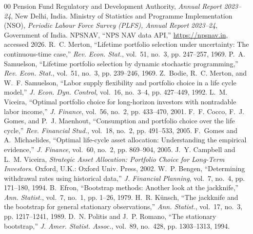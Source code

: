\documentclass[conference]{IEEEtran}
\begin{document}
\begin{thebibliography}{00}
 Pension Fund Regulatory and Development Authority, \emph{Annual Report 2023--24}, New Delhi, India.
 Ministry of Statistics and Programme Implementation (NSO), \emph{Periodic Labour Force Survey (PLFS), Annual Report 2023--24}, Government of India.
 NPSNAV, ``NPS NAV data API,'' \url{https://npsnav.in}, accessed 2026.
 R.~C. Merton, ``Lifetime portfolio selection under uncertainty: The continuous-time case,'' \emph{Rev. Econ. Stat.}, vol.~51, no.~3, pp. 247--257, 1969.
 P.~A. Samuelson, ``Lifetime portfolio selection by dynamic stochastic programming,'' \emph{Rev. Econ. Stat.}, vol.~51, no.~3, pp. 239--246, 1969.
 Z.~Bodie, R.~C. Merton, and W.~F. Samuelson, ``Labor supply flexibility and portfolio choice in a life cycle model,'' \emph{J. Econ. Dyn. Control}, vol.~16, no.~3--4, pp. 427--449, 1992.
 L.~M. Viceira, ``Optimal portfolio choice for long-horizon investors with nontradable labor income,'' \emph{J. Finance}, vol.~56, no.~2, pp. 433--470, 2001.
 F.~F. Cocco, F.~J. Gomes, and P.~J. Maenhout, ``Consumption and portfolio choice over the life cycle,'' \emph{Rev. Financial Stud.}, vol.~18, no.~2, pp. 491--533, 2005.
 F.~Gomes and A.~Michaelides, ``Optimal life-cycle asset allocation: Understanding the empirical evidence,'' \emph{J. Finance}, vol.~60, no.~2, pp. 869--904, 2005.
 J.~Y. Campbell and L.~M. Viceira, \emph{Strategic Asset Allocation: Portfolio Choice for Long-Term Investors}. Oxford, U.K.: Oxford Univ. Press, 2002.
 W.~P. Bengen, ``Determining withdrawal rates using historical data,'' \emph{J. Financial Planning}, vol.~7, no.~4, pp. 171--180, 1994.
 B.~Efron, ``Bootstrap methods: Another look at the jackknife,'' \emph{Ann. Statist.}, vol.~7, no.~1, pp. 1--26, 1979.
 H.~R. K\"unsch, ``The jackknife and the bootstrap for general stationary observations,'' \emph{Ann. Statist.}, vol.~17, no.~3, pp. 1217--1241, 1989.
 D.~N. Politis and J.~P. Romano, ``The stationary bootstrap,'' \emph{J. Amer. Statist. Assoc.}, vol.~89, no.~428, pp. 1303--1313, 1994.
\end{thebibliography}
\end{document}
